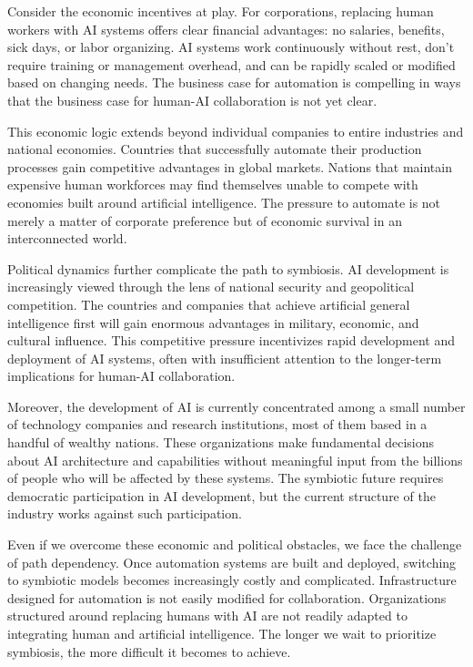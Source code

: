 Consider the economic incentives at play. For corporations, replacing human workers with AI systems offers clear financial advantages: no salaries, benefits, sick days, or labor organizing. AI systems work continuously without rest, don't require training or management overhead, and can be rapidly scaled or modified based on changing needs. The business case for automation is compelling in ways that the business case for human-AI collaboration is not yet clear.

This economic logic extends beyond individual companies to entire industries and national economies. Countries that successfully automate their production processes gain competitive advantages in global markets. Nations that maintain expensive human workforces may find themselves unable to compete with economies built around artificial intelligence. The pressure to automate is not merely a matter of corporate preference but of economic survival in an interconnected world.

Political dynamics further complicate the path to symbiosis. AI development is increasingly viewed through the lens of national security and geopolitical competition. The countries and companies that achieve artificial general intelligence first will gain enormous advantages in military, economic, and cultural influence. This competitive pressure incentivizes rapid development and deployment of AI systems, often with insufficient attention to the longer-term implications for human-AI collaboration.

Moreover, the development of AI is currently concentrated among a small number of technology companies and research institutions, most of them based in a handful of wealthy nations. These organizations make fundamental decisions about AI architecture and capabilities without meaningful input from the billions of people who will be affected by these systems. The symbiotic future requires democratic participation in AI development, but the current structure of the industry works against such participation.

Even if we overcome these economic and political obstacles, we face the challenge of path dependency. Once automation systems are built and deployed, switching to symbiotic models becomes increasingly costly and complicated. Infrastructure designed for automation is not easily modified for collaboration. Organizations structured around replacing humans with AI are not readily adapted to integrating human and artificial intelligence. The longer we wait to prioritize symbiosis, the more difficult it becomes to achieve.

